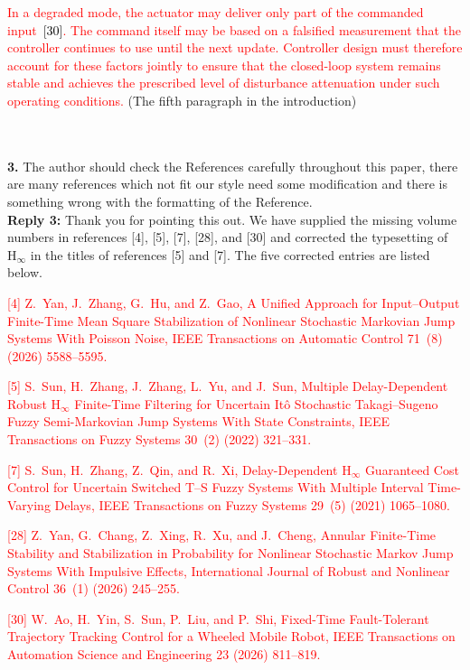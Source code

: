 \documentclass[10pt,fleqn]{article}
\begin{document}
\textcolor{red}{In a degraded mode, the actuator may deliver only part of the commanded input~\textcolor{black}{[30]}. The command itself may be based on a falsified measurement that the controller continues to use until the next update. Controller design must therefore account for these factors jointly to ensure that the closed-loop system remains stable and achieves the prescribed level of disturbance attenuation under such operating conditions.} (The fifth paragraph in the introduction)

~\\
\\
\textbf{3.} The author should check the References carefully throughout this paper, there are many references which not fit our style need some modification and there is something wrong with the formatting of the Reference.
\\[10pt]
\begingroup
\setlength{\parskip}{6pt}
\indent \textbf{Reply 3:} Thank you for pointing this out. We have supplied the missing volume numbers in references [4], [5], [7], [28], and [30] and corrected the typesetting of $\mathrm{H}_\infty$ in the titles of references [5] and [7]. The five corrected entries are listed below.\par
{ \textcolor{red}{[4] Z.~Yan, J.~Zhang, G.~Hu, and Z.~Gao, A {{Unified Approach}} for {{Input}}--{{Output Finite-Time Mean Square Stabilization}} of {{Nonlinear Stochastic Markovian Jump Systems With Poisson Noise}}, IEEE Transactions on Automatic Control 71~(8) (2026) 5588--5595.}\par}
{ \textcolor{red}{[5] S.~Sun, H.~Zhang, J.~Zhang, L.~Yu, and J.~Sun, Multiple {{Delay-Dependent Robust}} {$\mathrm{H}_\infty$} {{Finite-Time Filtering}} for {{Uncertain It\^o Stochastic Takagi}}--{{Sugeno Fuzzy Semi-Markovian Jump Systems With State Constraints}}, IEEE Transactions on Fuzzy Systems 30~(2) (2022) 321--331.}\par}
{ \textcolor{red}{[7] S.~Sun, H.~Zhang, Z.~Qin, and R.~Xi, Delay-{{Dependent}} {$\mathrm{H}_\infty$} {{Guaranteed Cost Control}} for {{Uncertain Switched T}}--{{S Fuzzy Systems With Multiple Interval Time-Varying Delays}}, IEEE Transactions on Fuzzy Systems 29~(5) (2021) 1065--1080.}\par}
{ \textcolor{red}{[28] Z.~Yan, G.~Chang, Z.~Xing, R.~Xu, and J.~Cheng, Annular {{Finite-Time Stability}} and {{Stabilization}} in {{Probability}} for {{Nonlinear Stochastic Markov Jump Systems With Impulsive Effects}}, International Journal of Robust and Nonlinear Control 36~(1) (2026) 245--255.}\par}
{ \textcolor{red}{[30] W.~Ao, H.~Yin, S.~Sun, P.~Liu, and P.~Shi, Fixed-{{Time Fault-Tolerant Trajectory Tracking Control}} for a {{Wheeled Mobile Robot}}, IEEE Transactions on Automation Science and Engineering 23 (2026) 811--819.}\par}
\endgroup
\end{document}
